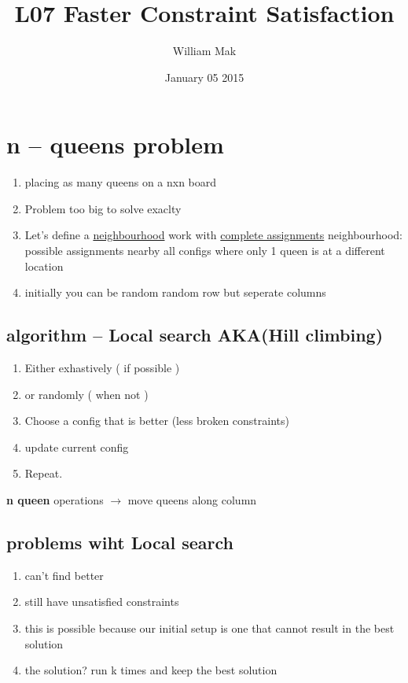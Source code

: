 \documentclass{article}
\title{L07 \- Faster Constraint Satisfaction}
\author{William Mak}
\date{January 05 2015}
\begin{document}
\maketitle
\section{n -- queens problem}
\begin{enumerate}
	\item placing as many queens on a nxn board
	\item Problem too big to solve exaclty
	\item Let's define a \underline{neighbourhood}
		\subitem work  with \underline{complete assignments}
		\subitem neighbourhood: possible assignments nearby
		\subitem all configs where only 1 queen is at a different location
	\item initially you can be random
		\subitem random row but seperate columns
\end{enumerate}
\subsection{algorithm -- Local search AKA(Hill climbing)}
\begin{enumerate}
	\item Either exhastively ( if possible )
	\item or randomly ( when not )
	\item Choose a config that is better (less broken constraints)
	\item update current config
	\item Repeat.
\end{enumerate}
\textbf{n queen}
\subitem operations $\to$ move queens along column
\subsection{problems wiht Local search}
\begin{enumerate}
	\item can't find better
	\item still have unsatisfied constraints
	\item this is possible because our initial setup is one that cannot result
		in the best solution
	\item the solution? run k times and keep the best solution
\end{enumerate}
\end{document}
